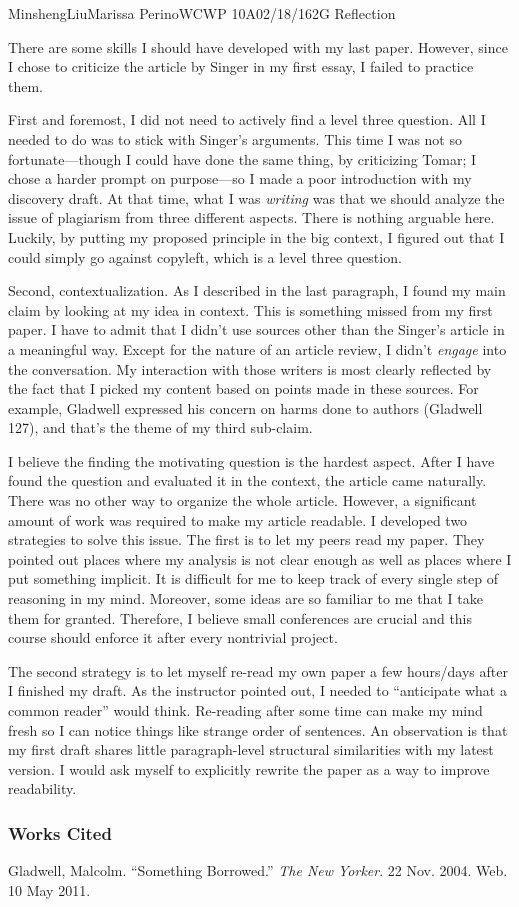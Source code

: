 \documentclass[12pt,letterpaper]{article}
\begin{document}
\begin{mla}{Minsheng}{Liu}{Marissa Perino}{WCWP 10A}{02/18/16}{2G Reflection}

There are some skills I should have developed with my last paper.
However, since I chose to criticize the article by Singer in my first
essay, I failed to practice them.

First and foremost, I did not need to actively find a level three
question. All I needed to do was to stick with Singer's arguments. This
time I was not so fortunate---though I could have done the same thing,
by criticizing Tomar; I chose a harder prompt on purpose---so I made a
poor introduction with my discovery draft. At that time, what I was
\emph{writing} was that we should analyze the issue of plagiarism from
three different aspects. There is nothing arguable here. Luckily, by
putting my proposed principle in the big context, I figured out that I
could simply go against copyleft, which is a level three question.

Second, contextualization. As I described in the last paragraph, I found
my main claim by looking at my idea in context. This is something missed
from my first paper. I have to admit that I didn't use sources other
than the Singer's article in a meaningful way. Except for the nature of
an article review, I didn't \emph{engage} into the conversation. My
interaction with those writers is most clearly reflected by the fact
that I picked my content based on points made in these sources. For
example, Gladwell expressed his concern on harms done to authors
(Gladwell 127), and that's the theme of my third sub-claim.

I believe the finding the motivating question is the hardest aspect.
After I have found the question and evaluated it in the context, the
article came naturally. There was no other way to organize the whole
article. However, a significant amount of work was required to make my
article readable. I developed two strategies to solve this issue. The
first is to let my peers read my paper. They pointed out places where my
analysis is not clear enough as well as places where I put something
implicit. It is difficult for me to keep track of every single step of
reasoning in my mind. Moreover, some ideas are so familiar to me that I
take them for granted. Therefore, I believe small conferences are
crucial and this course should enforce it after every nontrivial
project.

The second strategy is to let myself re-read my own paper a few
hours/days after I finished my draft. As the instructor pointed out, I
needed to ``anticipate what a common reader'' would think. Re-reading
after some time can make my mind fresh so I can notice things like
strange order of sentences. An observation is that my first draft shares
little paragraph-level structural similarities with my latest version. I
would ask myself to explicitly rewrite the paper as a way to improve
readability.

\subsubsection*{Works Cited}
\bibent Gladwell, Malcolm. ``Something Borrowed.'' \textit{The New Yorker}.
22 Nov. 2004. Web. 10 May 2011.
\end{mla}
\end{document}
